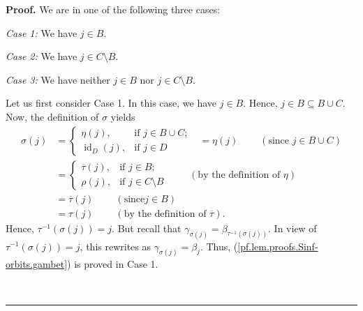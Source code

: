 \documentclass[numbers=enddot,12pt,final,onecolumn,notitlepage]{scrartcl}%
\theoremstyle{definition}
\newenvironment{proof}[1][Proof]{\noindent\textbf{#1.} }{\ \rule{0.5em}{0.5em}}
\newenvironment{verlong}{}{}
\begin{document}
\begin{verlong}
\begin{proof}
We are in one of the following three cases:

\textit{Case 1:} We have $j\in B$.

\textit{Case 2:} We have $j\in C\setminus B$.

\textit{Case 3:} We have neither $j\in B$ nor $j\in C\setminus B$.

Let us first consider Case 1. In this case, we have $j\in B$. Hence, $j\in
B\subseteq B\cup C$. Now, the definition of $\sigma$ yields
\begin{align*}
\sigma\left(  j\right)   &  =%
\begin{cases}
\eta\left(  j\right)  , & \text{if }j\in B\cup C;\\
\operatorname*{id}\nolimits_{D}\left(  j\right)  , & \text{if }j\in D
\end{cases}
\ \ \ =\eta\left(  j\right)  \ \ \ \ \ \ \ \ \ \ \left(  \text{since }j\in
B\cup C\right) \\
&  =%
\begin{cases}
\overline{\tau}\left(  j\right)  , & \text{if }j\in B;\\
\rho\left(  j\right)  , & \text{if }j\in C\setminus B
\end{cases}
\ \ \ \ \ \ \ \ \ \ \left(  \text{by the definition of }\eta\right) \\
&  =\overline{\tau}\left(  j\right)  \ \ \ \ \ \ \ \ \ \ \left(  \text{since
}j\in B\right) \\
&  =\tau\left(  j\right)  \ \ \ \ \ \ \ \ \ \ \left(  \text{by the definition
of }\overline{\tau}\right)  .
\end{align*}
Hence, $\tau^{-1}\left(  \sigma\left(  j\right)  \right)  =j$. But recall that
$\gamma_{\sigma\left(  j\right)  }=\beta_{\tau^{-1}\left(  \sigma\left(
j\right)  \right)  }$. In view of $\tau^{-1}\left(  \sigma\left(  j\right)
\right)  =j$, this rewrites as $\gamma_{\sigma\left(  j\right)  }=\beta_{j}$.
Thus, (\ref{pf.lem.proofs.Sinf-orbits.gambet}) is proved in Case 1.


\end{proof}
\end{verlong}
\end{document}
